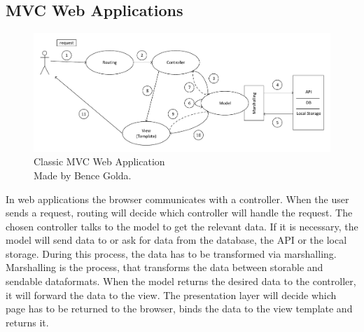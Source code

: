 \subsection{MVC Web Applications}


\begin{figure}[!ht]
	\includegraphics[width=\textwidth]{figures/klasszikus_mvc_webalkalmazas.pdf}
	\caption[Classic MVC Web Application]{Classic MVC Web Application\\Made by Bence Golda.}
	\label{fig:classic-mvc-webapplication}
\end{figure}

In web applications the browser communicates with a controller. When the user sends a request, routing will decide which controller will handle the request. The chosen controller talks to the model to get the relevant data. If it is necessary, the model will send data to or ask for data from the database, the API or the local storage. During this process, the data has to be transformed via marshalling. Marshalling is the process, that transforms the data between storable and sendable dataformats. When the model returns the desired data to the controller, it will forward the data to the view. The presentation layer will decide which page has to be returned to the browser, binds the data to the view template and returns it.


